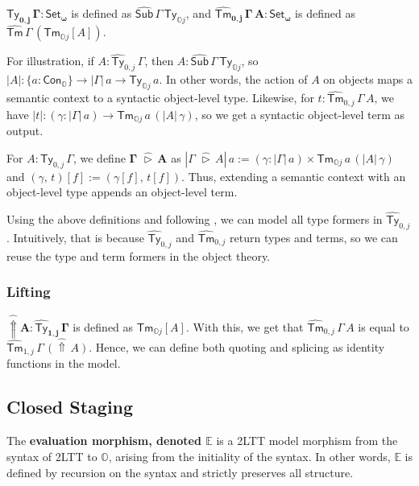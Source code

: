 \documentclass[acmsmall]{acmart}
\newcommand{\msf}[1]{\mathsf{#1}}
\newcommand{\mbb}[1]{\mathbb{#1}}
\newcommand{\bs}[1]{\boldsymbol{#1}}
\newcommand{\wh}[1]{\widehat{#1}}
\newcommand{\ext}{\triangleright}
\newcommand{\Lift}{{\Uparrow}}
\newcommand{\mbbo}{\mbb{O}}
\newcommand{\Ty}{\msf{Ty}}
\newcommand{\Tm}{\msf{Tm}}
\newcommand{\Cono}{\msf{Con}_{\mbbo}}
\newcommand{\hSub}{\wh{\msf{Sub}}}
\newcommand{\hTy}{\wh{\msf{Ty}}}
\newcommand{\hTm}{\wh{\msf{Tm}}}
\newcommand{\Set}{\mathsf{Set}}
\newcommand{\hato}{\bm\hat{\mbbo}}
\newcommand{\ev}{\mbb{E}}
\theoremstyle{remark}
\begin{document}
\begin{definition}
$\bs{\hTy_{0,j}\,\Gamma : \Set_\omega}$ is defined as $\hSub\,\Gamma\,\Ty_{\mbbo j}$,
and $\bs{\hTm_{0,j}\,\Gamma\,A : \Set_\omega}$ is defined as $\hTm\,\Gamma\,(\Tm_{\mbbo j}[A])$.
\end{definition}

For illustration, if $A : \hTy_{0,j}\,\Gamma$, then $A :
\hSub\,\Gamma\,\Ty_{\mbbo j}$, so $|A| : \{a : \Cono\} \to |\Gamma|\,a \to
\Ty_{\mbbo j}\,a$. In other words, the action of $A$ on objects maps a semantic
context to a syntactic object-level type. Likewise, for $t :
\hTm_{0,j}\,\Gamma\,A$, we have $|t| : (\gamma : |\Gamma|\,a) \to \Tm_{\mbbo
  j}\,a\,(|A|\,\gamma)$, so we get a syntactic object-level term as output.

\begin{definition} For $A : \Ty_{0,j}\,\Gamma$, we define $\bs{\Gamma\,\,\wh{\ext}\,A}$
as $|\Gamma\,\,\wh{\ext}\,A|\,a := (\gamma : |\Gamma|\,a) \times \Tm_{\mbbo
  j}\,a\,(|A|\,\gamma)$ and $(\gamma,\,t)[f] := (\gamma[f],\,t[f])$. Thus,
extending a semantic context with an object-level type appends an object-level
term.
\end{definition}


Using the above definitions and following \cite{TODO}, we can model all type
formers in $\hTy_{0,j}$. Intuitively, that is because $\hTy_{0,j}$ and
$\hTm_{0,j}$ return types and terms, so we can reuse the type and term formers
in the object theory.

\subsubsection{Lifting}

\begin{definition}
$\bs{\wh{\Lift} A : \hTy_{1,j}\,\Gamma}$ is defined as $\Tm_{\mbbo j}[A]$. With
  this, we get that $\hTm_{0,j}\,\Gamma\,A$ is equal to
  $\hTm_{1,j}\,\Gamma\,(\wh{\Lift}\,A)$. Hence, we can define both quoting and
  splicing as identity functions in the model.
\end{definition}

\subsection{Closed Staging}

\begin{definition} The \textbf{evaluation morphism, denoted $\bs{\ev}$} is
a 2LTT model morphism from the syntax of 2LTT to $\hato$, arising from the initiality
of the syntax. In other words, $\ev$ is defined by recursion on the syntax and
strictly preserves all structure.
\end{definition}
\end{document}
